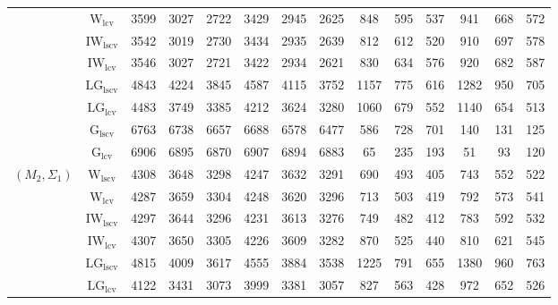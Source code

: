 \begin{table}[!ht]
{\begin{tabular}{@{}cc|ccc|ccc|ccc|ccc@{}}
 & $\mathrm{W}_{\mathrm{lcv}}$ & 3599 & 3027 & \cellcolor{black!10}2722 & \cellcolor{black!10}3429 & 2945 & 2625 & 848 & 595 & 537 & 941 & 668 & 572 \\ 
 & $\mathrm{IW}_{\mathrm{lscv}}$ & \cellcolor{black!30}3542 & \cellcolor{black!30}3019 & 2730 & 3434 & \cellcolor{black!10}2935 & 2639 & 812 & 612 & 520 & 910 & 697 & 578 \\ 
 & $\mathrm{IW}_{\mathrm{lcv}}$ & \cellcolor{black!10}3546 & 3027 & \cellcolor{black!30}2721 & \cellcolor{black!30}3422 & \cellcolor{black!30}2934 & \cellcolor{black!10}2621 & 830 & 634 & 576 & 920 & 682 & 587 \\ 
 & $\mathrm{LG}_{\mathrm{lscv}}$ & 4843 & 4224 & 3845 & 4587 & 4115 & 3752 & 1157 & 775 & 616 & 1282 & 950 & 705 \\ 
 & $\mathrm{LG}_{\mathrm{lcv}}$ & 4483 & 3749 & 3385 & 4212 & 3624 & 3280 & 1060 & 679 & 552 & 1140 & 654 & 513 \\ 
 & $\mathrm{G}_{\mathrm{lscv}}$ & 6763 & 6738 & 6657 & 6688 & 6578 & 6477 & \cellcolor{black!10}586 & 728 & 701 & \cellcolor{black!10}140 & \cellcolor{black!10}131 & \cellcolor{black!10}125 \\ 
 & $\mathrm{G}_{\mathrm{lcv}}$ & 6906 & 6895 & 6870 & 6907 & 6894 & 6883 & \cellcolor{black!30}65 & \cellcolor{black!30}235 & \cellcolor{black!30}193 & \cellcolor{black!30}51 & \cellcolor{black!30}93 & \cellcolor{black!30}120 \\ 
\midrule
$(M_2,\Sigma_1)$ & $\mathrm{W}_{\mathrm{lscv}}$ & 4308 & 3648 & 3298 & 4247 & 3632 & 3291 & 690 & 493 & \cellcolor{black!10}405 & \cellcolor{black!10}743 & \cellcolor{black!10}552 & \cellcolor{black!10}522 \\ 
 & $\mathrm{W}_{\mathrm{lcv}}$ & \cellcolor{black!10}4287 & 3659 & 3304 & 4248 & 3620 & 3296 & 713 & 503 & 419 & 792 & 573 & 541 \\ 
 & $\mathrm{IW}_{\mathrm{lscv}}$ & 4297 & \cellcolor{black!10}3644 & \cellcolor{black!10}3296 & 4231 & 3613 & \cellcolor{black!10}3276 & 749 & \cellcolor{black!10}482 & 412 & 783 & 592 & 532 \\ 
 & $\mathrm{IW}_{\mathrm{lcv}}$ & 4307 & 3650 & 3305 & \cellcolor{black!10}4226 & \cellcolor{black!10}3609 & 3282 & 870 & 525 & 440 & 810 & 621 & 545 \\ 
 & $\mathrm{LG}_{\mathrm{lscv}}$ & 4815 & 4009 & 3617 & 4555 & 3884 & 3538 & 1225 & 791 & 655 & 1380 & 960 & 763 \\ 
 & $\mathrm{LG}_{\mathrm{lcv}}$ & \cellcolor{black!30}4122 & \cellcolor{black!30}3431 & \cellcolor{black!30}3073 & \cellcolor{black!30}3999 & \cellcolor{black!30}3381 & \cellcolor{black!30}3057 & 827 & 563 & 428 & 972 & 652 & 526 \\ 

\end{tabular}}
\end{table}
